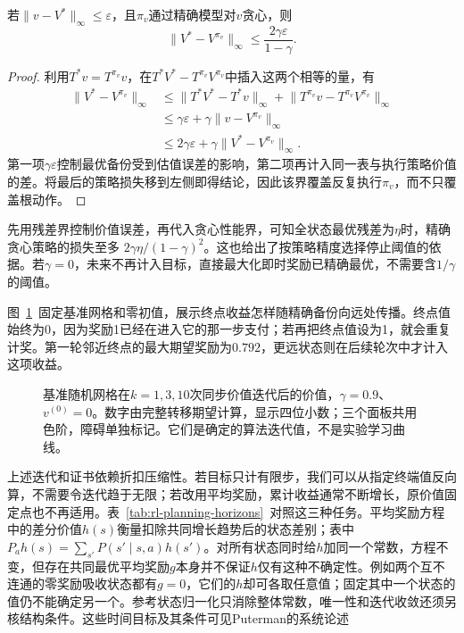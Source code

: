 \begin{theorem}[由价值精度到贪心策略性能]
 \label{thm:rl-planning-greedy-loss}
 若$\lVert v-V^*\rVert_\infty\leq\varepsilon$，且$\pi_v$通过精确模型对$v$贪心，则
 \begin{equation}
 \lVert V^*-V^{\pi_v}\rVert_\infty
 \leq\frac{2\gamma\varepsilon}{1-\gamma}.
 \label{eq:rl-planning-greedy-loss}
 \end{equation}
\end{theorem}
\begin{proof}
 利用$T^*v=T^{\pi_v}v$，在$T^*V^*-T^{\pi_v}V^{\pi_v}$中插入这两个相等的量，有
 \[
 \begin{aligned}
 \lVert V^*-V^{\pi_v}\rVert_\infty
 &\leq\lVert T^*V^*-T^*v\rVert_\infty
       +\lVert T^{\pi_v}v-T^{\pi_v}V^{\pi_v}\rVert_\infty\\
 &\leq\gamma\varepsilon+
       \gamma\lVert v-V^{\pi_v}\rVert_\infty\\
 &\leq2\gamma\varepsilon+
       \gamma\lVert V^*-V^{\pi_v}\rVert_\infty.
 \end{aligned}
 \]
 第一项$\gamma\varepsilon$控制最优备份受到估值误差的影响，第二项再计入同一表与执行策略价值的差。将最后的策略损失移到左侧即得结论，因此该界覆盖反复执行$\pi_v$，而不只覆盖根动作。
\end{proof}

先用残差界控制价值误差，再代入贪心性能界，可知全状态最优残差为$\eta$时，精确贪心策略的损失至多
$2\gamma\eta/(1-\gamma)^2$。这也给出了按策略精度选择停止阈值的依据。若$\gamma=0$，未来不再计入目标，直接最大化即时奖励已精确最优，不需要含$1/\gamma$的阈值。

图~\ref{fig:rl-planning-grid-values}~固定基准网格和零初值，展示终点收益怎样随精确备份向远处传播。终点值始终为0，因为奖励1已经在进入它的那一步支付；若再把终点值设为1，就会重复计奖。第一轮邻近终点的最大期望奖励为$0.792$，更远状态则在后续轮次中才计入这项收益。

\begin{figure}[htbp]
 \centering
 
 \caption{基准随机网格在$k=1,3,10$次同步价值迭代后的价值，$\gamma=0.9$、$v^{(0)}=0$。数字由完整转移期望计算，显示四位小数；三个面板共用色阶，障碍单独标记。它们是确定的算法迭代值，不是实验学习曲线。}
 \label{fig:rl-planning-grid-values}
\end{figure}

上述迭代和证书依赖折扣压缩性。若目标只计有限步，我们可以从指定终端值反向算，不需要令迭代趋于无限；若改用平均奖励，累计收益通常不断增长，原价值固定点也不再适用。表~\ref{tab:rl-planning-horizons}~对照这三种任务。平均奖励方程中的差分价值$h(s)$衡量扣除共同增长趋势后的状态差别；表中$P_ah(s)=\sum_{s'}P(s'\mid s,a)h(s')$。对所有状态同时给$h$加同一个常数，方程不变，但存在共同最优平均奖励$g$本身并不保证$h$仅有这种不确定性。例如两个互不连通的零奖励吸收状态都有$g=0$，它们的$h$却可各取任意值；固定其中一个状态的值仍不能确定另一个。参考状态归一化只消除整体常数，唯一性和迭代收敛还须另核结构条件。这些时间目标及其条件可见Puterman的系统论述

